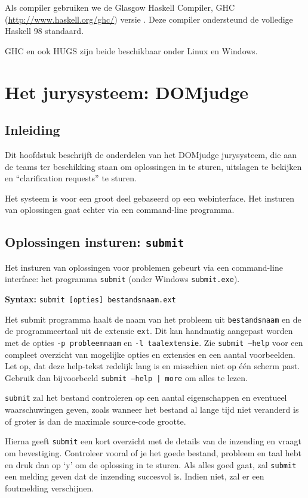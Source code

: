 \documentclass[11pt,titlepage,a4paper]{article}
\newcommand{\DOMjudge}{DOMjudge }
\begin{document}
Als compiler gebruiken we de Glasgow Haskell Compiler, GHC
(\url{http://www.haskell.org/ghc/}) versie \LINUXGHC. Deze compiler
ondersteund de volledige Haskell 98 standaard.

GHC en ook HUGS zijn beide beschikbaar onder Linux en Windows.


\newpage
\section{Het jurysysteem: \DOMjudge}

\subsection{Inleiding}

Dit hoofdstuk beschrijft de onderdelen van het \DOMjudge
jurysysteem, die aan de teams ter beschikking staan om oplossingen in
te sturen, uitslagen te bekijken en ``clarification requests'' te
sturen.

Het systeem is voor een groot deel gebaseerd op een webinterface. Het
insturen van oplossingen gaat echter via een command-line programma.

\subsection{Oplossingen insturen: \texttt{submit}}\label{submit}

Het insturen van oplossingen voor problemen gebeurt via een
command-line interface: het programma \texttt{submit} (onder Windows
\texttt{submit.exe}).

\textbf{Syntax:} \texttt{submit [opties] bestandsnaam.ext}

Het submit programma haalt de naam van het probleem uit
\texttt{bestandsnaam} en de de programmeertaal uit de extensie
\texttt{ext}. Dit kan handmatig aangepast worden met de opties
\texttt{-p probleemnaam} en \texttt{-l taalextensie}. Zie
\texttt{submit --help} voor een compleet overzicht van mogelijke
opties en extensies en een aantal voorbeelden. Let op, dat deze help-tekst
redelijk lang is en misschien niet op \'e\'en scherm past. Gebruik dan
bijvoorbeeld \texttt{submit --help | more} om alles te lezen.

\texttt{submit} zal het bestand controleren op een aantal eigenschappen
en eventueel waarschuwingen geven, zoals wanneer het bestand al lange
tijd niet veranderd is of groter is dan de maximale source-code grootte.

Hierna geeft \texttt{submit} een kort overzicht met de details van de
inzending en vraagt om bevestiging. Controleer vooral of je het goede
bestand, probleem en taal hebt en druk dan op `y' om de oplossing in
te sturen. Als alles goed gaat, zal \texttt{submit} een melding geven
dat de inzending succesvol is. Indien niet, zal er een foutmelding
verschijnen.
\end{document}
